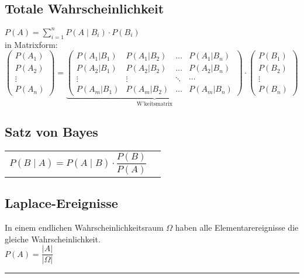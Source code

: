 \begin{minipage}[t]{11.5cm}
	\subsection{Totale Wahrscheinlichkeit \skript{\pageref{sk-zerlegung}}}
		$\boxed{P(A)=\sum\limits_{i=1}^n P(A\mid B_i)\cdot P(B_i)}$ \\
	
		in Matrixform: \\
		$\begin{pmatrix}P(A_1)\\P(A_2)\\\vdots\\P(A_n)\end{pmatrix} = 
		\underbrace{\begin{pmatrix}P(A_1|B_1) & P(A_1|B_2) & \ldots & P(A_1|B_n) \\
		P(A_2|B_1) & P(A_2|B_2) & \ldots & P(A_2|B_n) \\
		\vdots & \vdots & \ddots & \cdots \\
		P(A_m|B_1) & P(A_m|B_2) & \ldots & P(A_m|B_n)\end{pmatrix}}_{\text{W'keitsmatrix}}
		\cdot \begin{pmatrix}P(B_1)\\P(B_2)\\\vdots\\P(B_n)\end{pmatrix}$
	\end{minipage}
\begin{minipage}[t]{7cm}
\subsection{Satz von Bayes \skript{\pageref{sk-satz-von-bayes}}}
\begin{tabular}{ll}
  $\boxed{P(B\mid A)=P(A\mid B) \cdot\dfrac{P(B)}{P(A)}}$
  \vspace{1mm}
\end{tabular}
\subsection{Laplace-Ereignisse \skript{\pageref{sk-section-laplace-ereignisse}}}
In einem endlichen Wahrscheinlichkeitsraum $\Omega$ haben alle
Elementarereignisse die gleiche Wahrscheinlichkeit. \\
$\boxed{P(A)=\dfrac{\left| A\right|}{\left|\Omega\right|}}$ \\
\end{minipage}

\hrule

